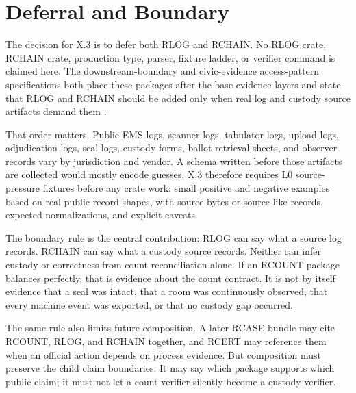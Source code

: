 \section{Deferral and Boundary}

The decision for X.3 is to defer both RLOG and RCHAIN. No RLOG crate, RCHAIN
crate, production type, parser, fixture ladder, or verifier command is claimed
here. The downstream-boundary and civic-evidence access-pattern specifications
both place these packages after the base evidence layers and state that RLOG and
RCHAIN should be added only when real log and custody source artifacts demand
them \citep{civic-evidence-boundaries-2026}.

That order matters. Public EMS logs, scanner logs, tabulator logs, upload logs,
adjudication logs, seal logs, custody forms, ballot retrieval sheets, and
observer records vary by jurisdiction and vendor. A schema written before those
artifacts are collected would mostly encode guesses. X.3 therefore requires L0
source-pressure fixtures before any crate work: small positive and negative
examples based on real public record shapes, with source bytes or source-like
records, expected normalizations, and explicit caveats.

The boundary rule is the central contribution: RLOG can say what a source log
records. RCHAIN can say what a custody source records. Neither can infer
custody or correctness from count reconciliation alone. If an RCOUNT package
balances perfectly, that is evidence about the count contract. It is not by
itself evidence that a seal was intact, that a room was continuously observed,
that every machine event was exported, or that no custody gap occurred.

The same rule also limits future composition. A later RCASE bundle may cite
RCOUNT, RLOG, and RCHAIN together, and RCERT may reference them when an official
action depends on process evidence. But composition must preserve the child
claim boundaries. It may say which package supports which public claim; it must
not let a count verifier silently become a custody verifier.
